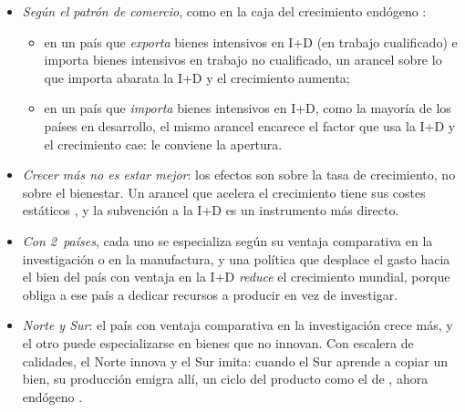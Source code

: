 \documentclass[11pt]{article}
\begin{document}
\begin{itemize}
\item \emph{Según el patrón de comercio}, como en la caja del crecimiento endógeno :
  \begin{itemize}
  \item en un país que \emph{exporta} bienes intensivos en I+D (en trabajo cualificado) e importa bienes intensivos en trabajo no cualificado, un arancel sobre lo que importa abarata la I+D y el crecimiento aumenta;
  \item en un país que \emph{importa} bienes intensivos en I+D, como la mayoría de los países en desarrollo, el mismo arancel encarece el factor que usa la I+D y el crecimiento cae: le conviene la apertura.
  \end{itemize}
\item \emph{Crecer más no es estar mejor}: los efectos son sobre la tasa de crecimiento, no sobre el bienestar. Un arancel que acelera el crecimiento tiene sus costes estáticos , y la subvención a la I+D es un instrumento más directo\nocite{GrossmanHelpman1991Small}.
\item \emph{Con 2~países}\nocite{GrossmanHelpman1990Comparative}, cada uno se especializa según su ventaja comparativa en la investigación o en la manufactura, y una política que desplace el gasto hacia el bien del país con ventaja en la I+D \emph{reduce} el crecimiento mundial, porque obliga a ese país a dedicar recursos a producir en vez de investigar.
\item \emph{Norte y Sur}: el país con ventaja comparativa en la investigación crece más, y el otro puede especializarse en bienes que no innovan\nocite{GrossmanHelpman1991}. Con escalera de calidades\nocite{GrossmanHelpman1991Quality}, el Norte innova y el Sur imita: cuando el Sur aprende a copiar un bien, su producción emigra allí, un ciclo del producto como el de \textcite{Vernon1966International}, ahora endógeno .
\end{itemize}
\end{document}
